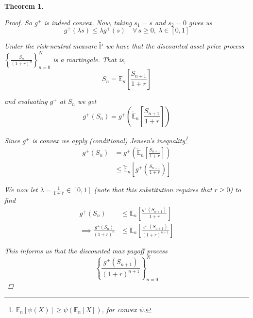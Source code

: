 \documentclass[12pt]{article}
\newtheorem{theorem}{Theorem}
\newlength\tindent
\renewcommand{\indent}{\hspace*{\tindent}}
\renewcommand{\P}{\mathbb P}
\newcommand{\E}{\mathbb E}
\begin{document}
\begin{theorem}
\begin{proof}
So $g^+$ is indeed convex. Now, taking $s_1 = s$ and $s_2 = 0$ gives us
\begin{equation*}
	g^+(\lambda s) \leq \lambda g^+(s) \quad \forall\,s \geq 0,~\lambda\in[0,1]
\end{equation*}

\indent Under the risk-neutral measure $\tilde{\P}$ we have that the discounted asset price process $\left\{ \frac{S_n}{(1 + r)^n} \right\}^N_{n = 0}$ is a martingale. That is,
\begin{equation*}
	S_n = \tilde{\E}_n \left[ \frac{S_{n + 1}}{1 + r} \right]
\end{equation*}

and evaluating $g^+$ at $S_n$ we get
\begin{equation*}
	g^+(S_n) = g^+ \left( \tilde{\E}_n \left[ \frac{S_{n + 1}}{1 + r} \right] \right)
\end{equation*}

Since $g^+$ is convex we apply (conditional) Jensen's inequality\footnote{$\E_n[\psi(X)] \geq \psi(\E_n[X])$, for convex $\psi$.}
\begin{align*}
	g^+(S_n) &= g^+ \left( \tilde{\E}_n \left[ \frac{S_{n + 1}}{1 + r} \right] \right) \\
	&\leq \tilde{\E}_n \left[ g^+ \left( \frac{S_{n + 1}}{1 + r} \right) \right]
\end{align*}

We now let $\lambda = \frac{1}{1 + r} \in [0,1]$ (note that this substitution requires that $r \geq 0$) to find
\begin{align*}
	g^+(S_n) &\leq \tilde{\E}_n \left[ \frac{ g^+ \left( S_{n + 1} \right) }{1 + r} \right] \\
	\implies \frac{ g^+(S_n) }{(1 + r)^n} &\leq \tilde{\E}_n \left[ \frac{ g^+ \left( S_{n + 1} \right) }{(1 + r)^{n + 1}} \right]
\end{align*}

This informs us that the discounted max payoff process
\begin{equation*}
	\left\{  \frac{ g^+ \left( S_{n + 1} \right) }{(1 + r)^{n + 1}} \right\}^N_{n = 0}
\end{equation*}


\end{proof}
\end{theorem}
\end{document}
